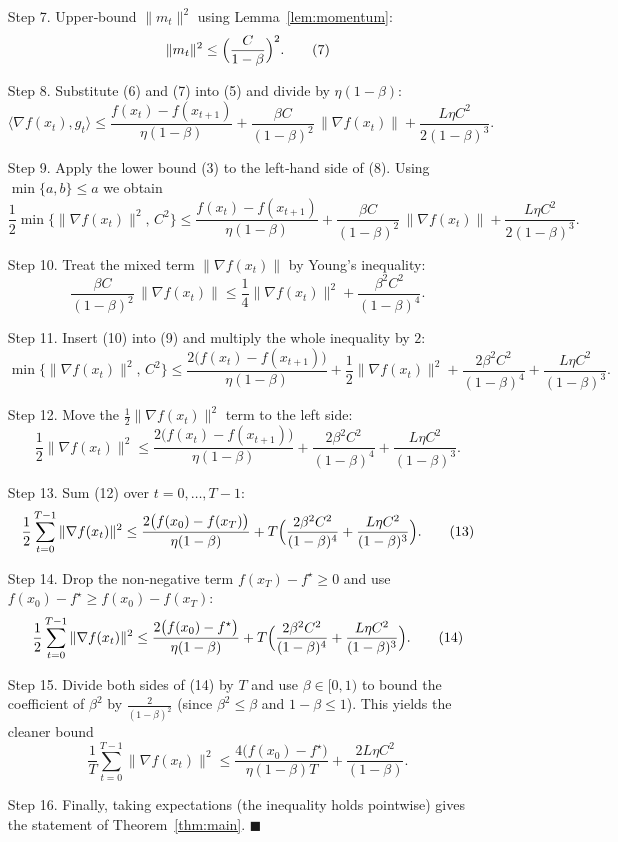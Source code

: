\documentclass{article}
\begin{document}
\begin{enumerate}
\item[Step 7.] Upper‑bound $\|m_t\|^2$ using Lemma~\ref{lem:momentum}:
\[
\|m_t\|^2\le\Bigl(\frac{C}{1-\beta}\Bigr)^2 .\tag{7}
\]

\item[Step 8.] Substitute (6) and (7) into (5) and divide by $\eta(1-\beta)$:
\[
\langle\nabla f(x_t),g_t\rangle
\le \frac{f(x_t)-f(x_{t+1})}{\eta(1-\beta)}
+\frac{\beta C}{(1-\beta)^2}\,\|\nabla f(x_t)\|
+\frac{L\eta C^2}{2(1-\beta)^3}. \tag{8}
\]

\item[Step 9.] Apply the lower bound (3) to the left‑hand side of (8). Using $\min\{a,b\}\le a$ we obtain
\[
\frac12\min\{\|\nabla f(x_t)\|^2,\,C^2\}
\le \frac{f(x_t)-f(x_{t+1})}{\eta(1-\beta)}
+\frac{\beta C}{(1-\beta)^2}\,\|\nabla f(x_t)\|
+\frac{L\eta C^2}{2(1-\beta)^3}. \tag{9}
\]

\item[Step 10.] Treat the mixed term $\|\nabla f(x_t)\|$ by Young’s inequality:
\[
\frac{\beta C}{(1-\beta)^2}\,\|\nabla f(x_t)\|
\le \frac{1}{4}\|\nabla f(x_t)\|^2
+\frac{\beta^2 C^2}{(1-\beta)^4}. \tag{10}
\]

\item[Step 11.] Insert (10) into (9) and multiply the whole inequality by $2$:
\[
\min\{\|\nabla f(x_t)\|^2,\,C^2\}
\le \frac{2\bigl(f(x_t)-f(x_{t+1})\bigr)}{\eta(1-\beta)}
+\frac{1}{2}\|\nabla f(x_t)\|^2
+\frac{2\beta^2 C^2}{(1-\beta)^4}
+\frac{L\eta C^2}{(1-\beta)^3}. \tag{11}
\]

\item[Step 12.] Move the $\frac12\|\nabla f(x_t)\|^2$ term to the left side:
\[
\frac12\|\nabla f(x_t)\|^2
\le \frac{2\bigl(f(x_t)-f(x_{t+1})\bigr)}{\eta(1-\beta)}
+\frac{2\beta^2 C^2}{(1-\beta)^4}
+\frac{L\eta C^2}{(1-\beta)^3}. \tag{12}
\]

\item[Step 13.] Sum (12) over $t=0,\dots,T-1$:
\[
\frac12\sum_{t=0}^{T-1}\|\nabla f(x_t)\|^2
\le \frac{2\bigl(f(x_0)-f(x_T)\bigr)}{\eta(1-\beta)}
+T\Bigl(\frac{2\beta^2 C^2}{(1-\beta)^4}
+\frac{L\eta C^2}{(1-\beta)^3}\Bigr). \tag{13}
\]

\item[Step 14.] Drop the non‑negative term $f(x_T)-f^\star\ge0$ and use $f(x_0)-f^\star\ge f(x_0)-f(x_T)$:
\[
\frac12\sum_{t=0}^{T-1}\|\nabla f(x_t)\|^2
\le \frac{2\bigl(f(x_0)-f^\star\bigr)}{\eta(1-\beta)}
+T\Bigl(\frac{2\beta^2 C^2}{(1-\beta)^4}
+\frac{L\eta C^2}{(1-\beta)^3}\Bigr). \tag{14}
\]

\item[Step 15.] Divide both sides of (14) by $T$ and use $\beta\in[0,1)$ to bound the coefficient of $\beta^2$ by $\frac{2}{(1-\beta)^2}$ (since $\beta^2\le\beta$ and $1-\beta\le1$). This yields the cleaner bound
\[
\frac{1}{T}\sum_{t=0}^{T-1}\|\nabla f(x_t)\|^2
\le
\frac{4\bigl(f(x_0)-f^\star\bigr)}{\eta(1-\beta)T}
+\frac{2L\eta C^2}{(1-\beta)} .
\tag{15}
\]

\item[Step 16.] Finally, taking expectations (the inequality holds pointwise) gives the statement of Theorem~\ref{thm:main}. \hfill $\blacksquare$
\end{enumerate}
\end{document}
